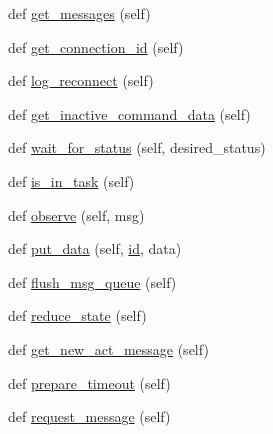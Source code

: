 \begin{DoxyCompactItemize}
\item 
def \hyperlink{classparlai_1_1mturk_1_1core_1_1legacy__2018_1_1agents_1_1MTurkAgent_a65cc11f8cdca69113217f82d11bdfcc3}{get\+\_\+messages} (self)
\item 
def \hyperlink{classparlai_1_1mturk_1_1core_1_1legacy__2018_1_1agents_1_1MTurkAgent_ac8a29e82cef967de9646252059c6658b}{get\+\_\+connection\+\_\+id} (self)
\item 
def \hyperlink{classparlai_1_1mturk_1_1core_1_1legacy__2018_1_1agents_1_1MTurkAgent_affe73b112be62cb32e0f8122c5f030fd}{log\+\_\+reconnect} (self)
\item 
def \hyperlink{classparlai_1_1mturk_1_1core_1_1legacy__2018_1_1agents_1_1MTurkAgent_aa67e2dfc302ace9edd9d12a79ff24521}{get\+\_\+inactive\+\_\+command\+\_\+data} (self)
\item 
def \hyperlink{classparlai_1_1mturk_1_1core_1_1legacy__2018_1_1agents_1_1MTurkAgent_a523bffdcd46a437e641b94f5700c0e16}{wait\+\_\+for\+\_\+status} (self, desired\+\_\+status)
\item 
def \hyperlink{classparlai_1_1mturk_1_1core_1_1legacy__2018_1_1agents_1_1MTurkAgent_a575ea7912571bb6e565f9e12b2c19ea6}{is\+\_\+in\+\_\+task} (self)
\item 
def \hyperlink{classparlai_1_1mturk_1_1core_1_1legacy__2018_1_1agents_1_1MTurkAgent_ac974df04c688a98380b47bd12f412e4d}{observe} (self, msg)
\item 
def \hyperlink{classparlai_1_1mturk_1_1core_1_1legacy__2018_1_1agents_1_1MTurkAgent_abcc954a77ce4be0d6c51b65d51553c07}{put\+\_\+data} (self, \hyperlink{classparlai_1_1mturk_1_1core_1_1legacy__2018_1_1agents_1_1MTurkAgent_ad02ce7daf281aec9afb211f079b12ff0}{id}, data)
\item 
def \hyperlink{classparlai_1_1mturk_1_1core_1_1legacy__2018_1_1agents_1_1MTurkAgent_a209329c54335277c0998a9185cdfc1d7}{flush\+\_\+msg\+\_\+queue} (self)
\item 
def \hyperlink{classparlai_1_1mturk_1_1core_1_1legacy__2018_1_1agents_1_1MTurkAgent_ad6b25298f44461404805c398c3f08ac5}{reduce\+\_\+state} (self)
\item 
def \hyperlink{classparlai_1_1mturk_1_1core_1_1legacy__2018_1_1agents_1_1MTurkAgent_a4a4600fbaef5ddae36ae3d74542b35fe}{get\+\_\+new\+\_\+act\+\_\+message} (self)
\item 
def \hyperlink{classparlai_1_1mturk_1_1core_1_1legacy__2018_1_1agents_1_1MTurkAgent_a8b3209004d4c83fdb11cacb82528e871}{prepare\+\_\+timeout} (self)
\item 
def \hyperlink{classparlai_1_1mturk_1_1core_1_1legacy__2018_1_1agents_1_1MTurkAgent_a7c3620ae641e70de1b9d212910ec1158}{request\+\_\+message} (self)

\end{DoxyCompactItemize}
